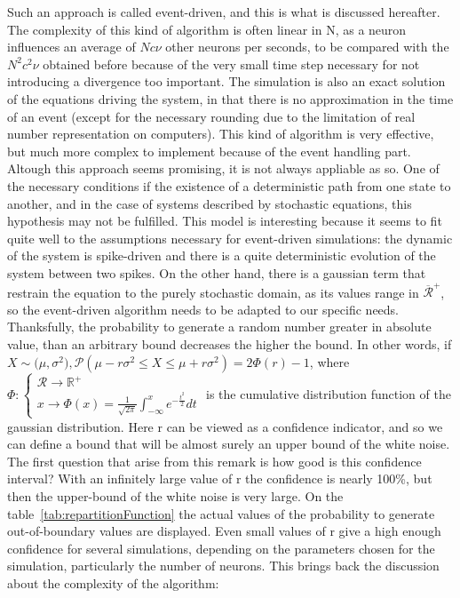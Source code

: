 	Such an approach is called event-driven, and this is what is discussed hereafter. The complexity of this kind of algorithm is often linear in N, as a neuron influences an average of $Nc\nu$ other neurons per seconds, to be compared with the $N^2c^2\nu$ obtained before because of the very small time step necessary for not introducing a divergence too important. The simulation is also an exact solution of the equations driving the system, in that there is no approximation in the time of an event (except for the necessary rounding due to the limitation of real number representation on computers). This kind of algorithm is very effective, but much more complex to implement because of the event handling part.\\
	Altough this approach seems promising, it is not always appliable as so. One of the necessary conditions if the existence of a deterministic path from one state to another, and in the case of systems described by stochastic equations, this hypothesis may not be fulfilled. 
	This model is interesting because it seems to fit quite well to the assumptions necessary for event-driven simulations: the dynamic of the system is spike-driven and there is a quite deterministic evolution of the system between two spikes. On the other hand, there is a gaussian term that restrain the equation to the purely stochastic domain, as its values range in $\overline{\mathscr{R}}^+$, so the event-driven algorithm needs to be adapted to our specific needs. Thanksfully, the probability to generate a random number greater in absolute value, than an arbitrary bound decreases the higher the bound. In other words, if $X\sim\mathbb(\mu,\sigma^2), \mathscr{P}(\mu-r\sigma^2\leq X\leq\mu+r\sigma^2)=2\Phi(r)-1$, where $\Phi:\begin{cases}\mathscr{R}\to\mathbb{R}^+\\x\to\Phi(x)=\frac{1}{\sqrt{2\pi}}\int_{-\infty}^x e^{-\frac{t^2}{2}}dt\end{cases}$ is the cumulative distribution function of the gaussian distribution. Here r can be viewed as a confidence indicator, and so we can define a bound that will be almost surely an upper bound of the white noise.\\
	The first question that arise from this remark is how good is this confidence interval? With an infinitely large value of r the confidence is nearly 100\%, but then the upper-bound of the white noise is very large. On the table~\ref{tab:repartitionFunction} the actual values of the probability to generate out-of-boundary values are displayed. Even small values of r give a high enough confidence for several simulations, depending on the parameters chosen for the simulation, particularly the number of neurons. This brings back the discussion about the complexity of the algorithm: 
